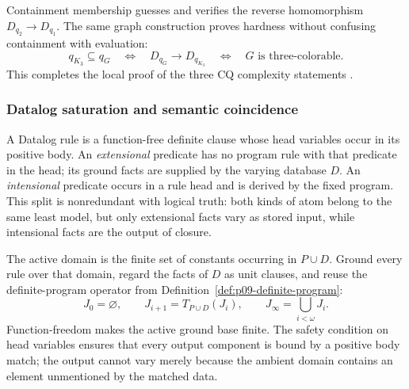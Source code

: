 Containment membership guesses and verifies the reverse homomorphism
\(D_{q_2}\to D_{q_1}\).  The same graph construction proves hardness without
confusing containment with evaluation:
\[
 q_{K_3}\subseteq q_G
 \quad\Longleftrightarrow\quad
 D_{q_G}\longrightarrow D_{q_{K_3}}
 \quad\Longleftrightarrow\quad
 G\text{ is three-colorable}.
\]
This completes the local proof of the three CQ complexity statements
\cite[pp.~80--85]{ChandraMerlin1977}.

\subsubsection{Datalog saturation and semantic coincidence}

A Datalog rule is a function-free definite clause whose head variables occur
in its positive body.  An \emph{extensional} predicate has no program rule with
that predicate in the head; its ground facts are supplied by the varying
database \(D\).  An \emph{intensional} predicate occurs in a rule head and
is derived by the fixed program.  This split is nonredundant with logical
truth: both kinds of atom belong to the same least model, but only extensional
facts vary as stored input, while intensional facts are the output of closure.

The active domain is the finite set of constants occurring in \(P\cup D\).
Ground every rule over that domain, regard the facts of \(D\) as unit clauses,
and reuse the definite-program operator from
Definition~\ref{def:p09-definite-program}:
\[
 J_0=\varnothing,
 \qquad
 J_{i+1}=T_{P\cup D}(J_i),
 \qquad
 J_\infty=\bigcup_{i<\omega}J_i.
\]
Function-freedom makes the active ground base finite.  The safety condition on
head variables ensures that every output component is bound by a positive body
match; the output cannot vary merely because the ambient domain contains an
element unmentioned by the matched data.

